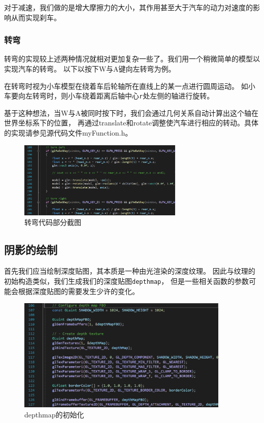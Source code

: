 \documentclass[UTF8]{ctexart}
\begin{document}
\par
对于减速，我们做的是增大摩擦力的大小，其作用甚至大于汽车的动力对速度的影响从而实现刹车。


\subsubsection{转弯}
\par
转弯的实现较上述两种情况就相对更加复杂一些了。我们用一个稍微简单的模型以实现汽车的转弯。
以下以按下W与A键向左转弯为例。

\par
在转弯时视为小车模型在绕着车后轮轴所在直线上的某一点进行圆周运动。
如小车要向左转弯时，则小车绕着距离后轴中心\verb|r|处左侧的轴进行旋转。

\par
基于这种想法，当W与A被同时按下时，我们会通过几何关系自动计算出这个轴在世界坐标系下的位置，
再通过translate和rotate调整使汽车进行相应的转动。具体的实现请参见源代码文件myFunction.h。

\begin{figure}[h]
	\centering
	\includegraphics*[width=0.7\textwidth]{3.png}
	\caption{转弯代码部分截图}
	\label{fig:3}
\end{figure}


\newpage

\subsection{阴影的绘制}
\par
首先我们应当绘制深度贴图，其本质是一种由光渲染的深度纹理。
因此与纹理的初始构造类似，我们生成我们的深度贴图\verb|depthmap|，
但是一些相关函数的参数可能会根据深度贴图的需要发生少许的变化。

\begin{figure}[h]
	\centering
	\includegraphics*[width=0.9\textwidth]{4.png}
	\caption{depthmap的初始化}
	\label{fig:4}
\end{figure}
\end{document}

